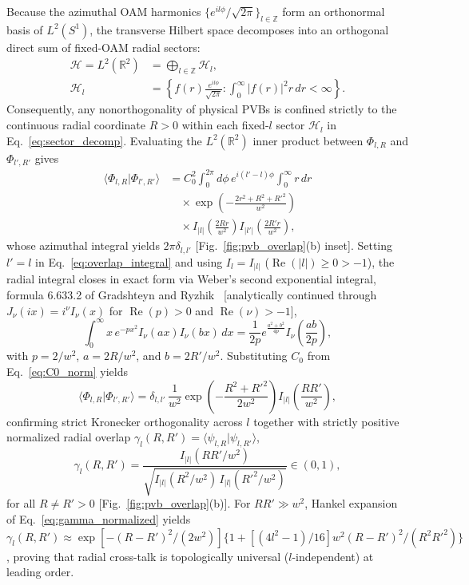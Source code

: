 \documentclass[aps,pra,reprint,nofootinbib,floatfix,longbibliography]{revtex4-2}
\theoremstyle{remark}
\newcommand{\braket}[2]{\langle #1 | #2 \rangle}
\newcommand{\abs}[1]{\lvert #1 \rvert}
\begin{document}
Because the azimuthal OAM harmonics $\{e^{il\phi}/\sqrt{2\pi}\}_{l\in\mathbb{Z}}$ form an orthonormal basis of $L^2(S^1)$, the transverse Hilbert space decomposes into an orthogonal direct sum of fixed-OAM radial sectors:
\begin{align}
\mathcal{H} = L^2(\mathbb{R}^2) &= \bigoplus_{l\in\mathbb{Z}} \mathcal{H}_l, \nonumber \\
\mathcal{H}_l &= \left\{ f(r)\frac{e^{il\phi}}{\sqrt{2\pi}} : \int_0^\infty \abs{f(r)}^2 r\,dr < \infty \right\}.
\label{eq:sector_decomp}
\end{align}
Consequently, any nonorthogonality of physical PVBs is confined strictly to the continuous radial coordinate $R > 0$ within each fixed-$l$ sector $\mathcal{H}_l$ in Eq.~\eqref{eq:sector_decomp}. Evaluating the $L^2(\mathbb{R}^2)$ inner product between $\Phi_{l,R}$ and $\Phi_{l',R'}$ gives
\begin{align}
\braket{\Phi_{l,R}}{\Phi_{l',R'}} &= C_0^2 \int_0^{2\pi} d\phi\, e^{i(l'-l)\phi} \int_0^\infty r\,dr \nonumber \\
&\quad \times \exp\!\left(-\frac{2r^2 + R^2 + R'^2}{w^2}\right) \nonumber \\
&\quad \times I_{\abs{l}}\!\left(\frac{2Rr}{w^2}\right) I_{\abs{l'}}\!\left(\frac{2R'r}{w^2}\right),
\label{eq:overlap_integral}
\end{align}
whose azimuthal integral yields $2\pi\delta_{l,l'}$ [Fig.~\ref{fig:pvb_overlap}(b) inset]. Setting $l' = l$ in Eq.~\eqref{eq:overlap_integral} and using $I_l = I_{\abs{l}}$ ($\operatorname{Re}(\abs{l}) \ge 0 > -1$), the radial integral closes in exact form via Weber's second exponential integral, formula 6.633.2 of Gradshteyn and Ryzhik~\cite{Gradshteyn2014} [analytically continued through $J_\nu(ix) = i^\nu I_\nu(x)$ for $\operatorname{Re}(p) > 0$ and $\operatorname{Re}(\nu) > -1$],
\begin{equation}
\int_0^\infty x\, e^{-p x^2} I_\nu(a x) I_\nu(b x)\,dx = \frac{1}{2p} e^{\frac{a^2 + b^2}{4p}} I_\nu\!\left(\frac{ab}{2p}\right),
\label{eq:weber_identity}
\end{equation}
with $p = 2/w^2$, $a = 2R/w^2$, and $b = 2R'/w^2$. Substituting $C_0$ from Eq.~\eqref{eq:C0_norm} yields
\begin{equation}
\braket{\Phi_{l,R}}{\Phi_{l',R'}} = \delta_{l,l'}\,\frac{1}{w^2}\exp\!\left(-\frac{R^2 + R'^2}{2w^2}\right) I_{\abs{l}}\!\left(\frac{RR'}{w^2}\right),
\label{eq:overlap_closed}
\end{equation}
confirming strict Kronecker orthogonality across $l$ together with strictly positive normalized radial overlap $\gamma_l(R,R') = \braket{\psi_{l,R}}{\psi_{l,R'}}$,
\begin{equation}
\gamma_l(R,R') = \frac{I_{\abs{l}}(RR'/w^2)}{\sqrt{I_{\abs{l}}(R^2/w^2)\,I_{\abs{l}}(R'^2/w^2)}} \in (0,1),
\label{eq:gamma_normalized}
\end{equation}
for all $R \neq R' > 0$ [Fig.~\ref{fig:pvb_overlap}(b)]. For $RR' \gg w^2$, Hankel expansion of Eq.~\eqref{eq:gamma_normalized} yields $\gamma_l(R,R') \approx \exp[-(R-R')^2/(2w^2)]\{1 + [(4l^2 - 1)/16]w^2(R-R')^2/(R^2 R'^2)\}$, proving that radial cross-talk is topologically universal ($l$-independent) at leading order.
\end{document}
